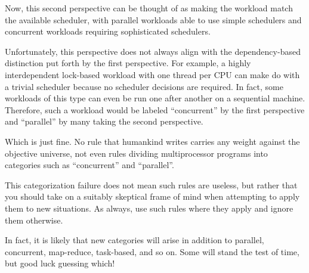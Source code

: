 Now, this second perspective can be thought of as making the workload
match the available scheduler, with parallel workloads able to
use simple schedulers and concurrent workloads requiring
sophisticated schedulers.

Unfortunately, this perspective does not always align with the
dependency-based distinction put forth by the first perspective.
For example, a highly interdependent lock-based workload
with one thread per CPU can make do with a trivial scheduler
because no scheduler decisions are required.
In fact, some workloads of this type can even be run one after another
on a sequential machine.
Therefore, such a workload would be labeled ``concurrent'' by the first
perspective and ``parallel'' by many taking the second perspective.

\QuickQuizEnd

Which is just fine.
No rule that humankind writes carries any weight against the objective
universe, not even rules dividing multiprocessor programs into categories
such as ``concurrent'' and ``parallel''.

This categorization failure does not mean such rules are useless,
but rather that you should take on a suitably skeptical frame of mind when
attempting to apply them to new situations.
As always, use such rules where they apply and ignore them otherwise.

In fact, it is likely that new categories will arise in addition
to parallel, concurrent, map-reduce, task-based, and so on.
Some will stand the test of time, but good luck guessing which!
